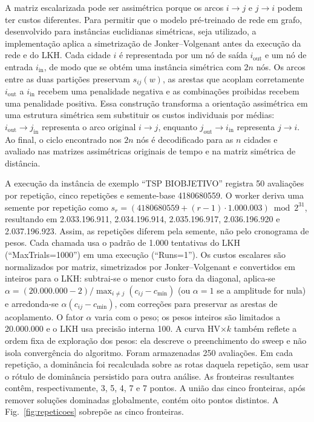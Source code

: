 \documentclass[conference]{IEEEtran}
\begin{document}
A matriz escalarizada pode ser assimétrica porque os arcos $i\rightarrow j$
e $j\rightarrow i$ podem ter custos diferentes. Para permitir que o modelo
pré-treinado de rede em grafo, desenvolvido para instâncias euclidianas
simétricas, seja utilizado, a implementação aplica a simetrização de
Jonker--Volgenant antes da execução da rede e do LKH. Cada cidade $i$ é
representada por um nó de saída $i_{\mathrm{out}}$ e um nó de entrada
$i_{\mathrm{in}}$, de modo que se obtém uma instância simétrica com $2n$
nós. Os arcos entre as duas partições preservam $s_{ij}(w)$, as arestas
que acoplam corretamente $i_{\mathrm{out}}$ a $i_{\mathrm{in}}$ recebem uma
penalidade negativa e as combinações proibidas recebem uma penalidade
positiva. Essa construção transforma a orientação assimétrica em uma
estrutura simétrica sem substituir os custos individuais por médias:
$i_{\mathrm{out}}\rightarrow j_{\mathrm{in}}$ representa o arco original
$i\rightarrow j$, enquanto $j_{\mathrm{out}}\rightarrow i_{\mathrm{in}}$
representa $j\rightarrow i$. Ao final, o ciclo encontrado nos $2n$ nós é
decodificado para as $n$ cidades e avaliado nas matrizes assimétricas
originais de tempo e na matriz simétrica de distância.

A execução da instância de exemplo ``TSP BIOBJETIVO'' registra 50 avaliações
por repetição, cinco repetições e semente-base 4180680559. O worker deriva
uma semente por repetição como
$s_r=(4180680559+(r-1)\cdot1.000.003)\bmod 2^{31}$, resultando em
2.033.196.911, 2.034.196.914, 2.035.196.917, 2.036.196.920 e
2.037.196.923. Assim, as repetições diferem pela semente, não pelo
cronograma de pesos. Cada chamada usa o padrão de 1.000 tentativas do LKH
(``MaxTrials=1000'') em uma execução (``Runs=1''). Os custos escalares são
normalizados por matriz, simetrizados por Jonker--Volgenant e convertidos em
inteiros para o LKH: subtrai-se o menor custo fora da diagonal, aplica-se
$\alpha=(20.000.000-2)/\max_{i\ne j}(c_{ij}-c_{\min})$ (ou $\alpha=1$ se a
amplitude for nula) e arredonda-se $\alpha(c_{ij}-c_{\min})$, com correções
para preservar as arestas de acoplamento. O fator $\alpha$ varia com o peso;
os pesos inteiros são limitados a 20.000.000 e o LKH usa precisão interna
100. A curva HV$\times k$ também reflete a ordem fixa de exploração dos pesos:
ela descreve o preenchimento do sweep e não isola convergência do algoritmo.
Foram armazenadas 250 avaliações. Em cada repetição, a dominância
foi recalculada sobre as rotas daquela repetição, sem usar o rótulo de
dominância persistido para outra análise. As fronteiras resultantes contêm,
respectivamente, 3, 5, 4, 7 e 7 pontos. A união das cinco fronteiras, após
remover soluções dominadas globalmente, contém oito pontos distintos. A
Fig.~\ref{fig:repeticoes} sobrepõe as cinco fronteiras.
\end{document}
